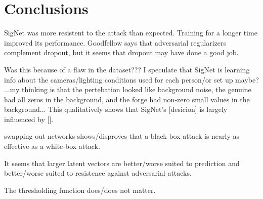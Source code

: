 \section{Conclusions}\label{sec:conclusion}

SigNet was more resistent to the attack than expected.
Training for a longer time improved its performance.
Goodfellow says that adversarial regularizers complement dropout, but it seems that dropout may have done a good job.

Was this because of a flaw in the dataset???
I speculate that SigNet is learning info about the cameras/lighting conditions used for each person/or set up maybe?
...my thinking is that the pertebation looked like background noise, the genuine had all zeros in the background, and the forge had non-zero small values in the background...
This qualitatively shows that SigNet's [desicion] is largely influenced by [].

swapping out networks shows/disproves that a black box attack is nearly as effective as a white-box attack.

It seems that larger latent vectors are better/worse suited to prediction and better/worse suited to resistence against adversarial attacks.

The thresholding function does/does not matter.

